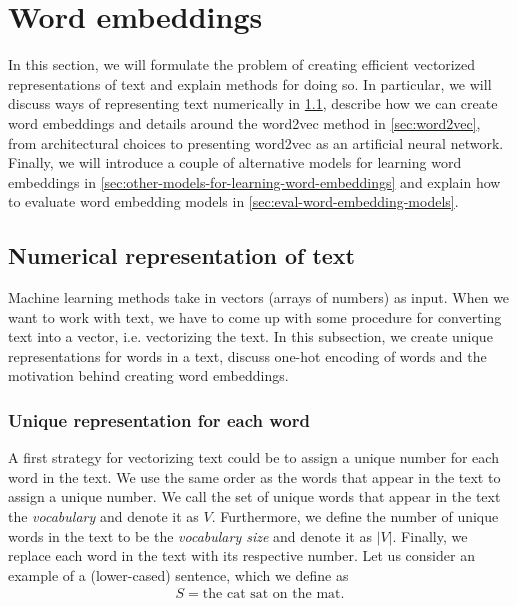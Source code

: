 \section{Word embeddings}
\label{sec:word-embeddings}
In this section, we will formulate the problem of creating efficient vectorized representations of text and explain methods for doing so. In particular, we will discuss ways of representing text numerically in \cref{sec:numerical-repr-of-text}, describe how we can create word embeddings and details around the word2vec method in \cref{sec:word2vec}, from architectural choices to presenting word2vec as an artificial neural network. Finally, we will introduce a couple of alternative models for learning word embeddings in \cref{sec:other-models-for-learning-word-embeddings} and explain how to evaluate word embedding models in \cref{sec:eval-word-embedding-models}.

\subsection{Numerical representation of text}
\label{sec:numerical-repr-of-text}
Machine learning methods take in vectors (arrays of numbers) as input. When we want to work with text, we have to come up with some procedure for converting text into a vector, i.e. vectorizing the text. In this subsection, we create unique representations for words in a text, discuss one-hot encoding of words and the motivation behind creating word embeddings.

\subsubsection{Unique representation for each word}
\label{unique-representation-for-each-word}
A first strategy for vectorizing text could be to assign a unique number for each word in the text. We use the same order as the words that appear in the text to assign a unique number. We call the set of unique words that appear in the text the \textit{vocabulary} and denote it as $V$. Furthermore, we define the number of unique words in the text to be the \textit{vocabulary size} and denote it as $|V|$. Finally, we replace each word in the text with its respective number. Let us consider an example of a (lower-cased) sentence, which we define as
\begin{align}
    S = \text{the cat sat on the mat}.
    \label{eqn:num-rep-ex-sent-words}
\end{align}

